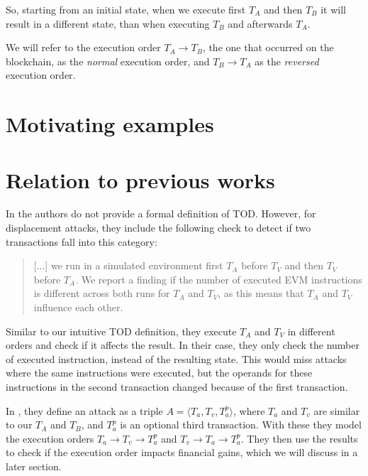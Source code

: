 \documentclass[draft,final]{vutinfth} %
\begin{document}
So, starting from an initial state, when we execute first $T_A$ and then $T_B$ it will result in a different state, than when executing $T_B$ and afterwards $T_A$.

We will refer to the execution order $T_A \rightarrow T_B$, the one that occurred on the blockchain, as the \emph{normal} execution order, and $T_B \rightarrow T_A$ as the \emph{reversed} execution order.

\section{Motivating examples}


\section{Relation to previous works}

In \cite{torres_frontrunner_2021} the authors do not provide a formal definition of TOD. However, for displacement attacks, they include the following check to detect if two transactions fall into this category:

\begin{quote}
    [...] we run in a simulated environment first $T_A$ before $T_V$ and then $T_V$ before $T_A$. We report a finding if the number of executed EVM instructions is different across both runs for $T_A$ and $T_V$, as this means that $T_A$ and $T_V$ influence each other.
\end{quote}

Similar to our intuitive TOD definition, they execute $T_A$ and $T_V$ in different orders and check if it affects the result. In their case, they only check the number of executed instruction, instead of the resulting state. This would miss attacks where the same instructions were executed, but the operands for these instructions in the second transaction changed because of the first transaction.

In \cite{zhang_combatting_2023}, they define an attack as a triple $A = \langle T_a, T_v, T_a^p\rangle$, where $T_a$ and $T_v$ are similar to our $T_A$ and $T_B$, and $T_a^p$ is an optional third transaction. With these they model the execution orders $T_a \rightarrow T_v \rightarrow T_a^p$ and $T_v \rightarrow T_a \rightarrow T_a^p$. They then use the results to check if the execution order impacts financial gains, which we will discuss in a later section.
\end{document}
